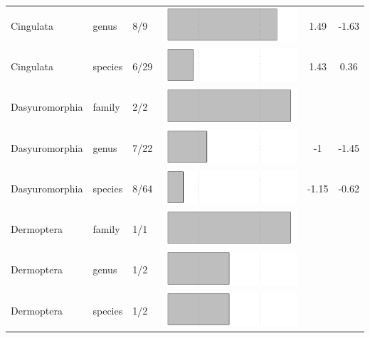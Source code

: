 \begin{longtable}{lL{1.8cm}C{2cm}ccc}
  Cingulata & genus & 8/9 & \includegraphics[width=0.20\linewidth, height=0.05\linewidth]{Missing_mammals/Table_figures/bar14.pdf} & 1.49 & -1.63 \\ 
  Cingulata & species & 6/29 & \includegraphics[width=0.20\linewidth, height=0.05\linewidth]{Missing_mammals/Table_figures/bar15.pdf} & 1.43 & 0.36 \\ 
  Dasyuromorphia & family & 2/2 & \includegraphics[width=0.20\linewidth, height=0.05\linewidth]{Missing_mammals/Table_figures/bar16.pdf} &   &   \\ 
  Dasyuromorphia & genus & 7/22 & \includegraphics[width=0.20\linewidth, height=0.05\linewidth]{Missing_mammals/Table_figures/bar17.pdf} & -1 & -1.45 \\ 
  Dasyuromorphia & species & 8/64 & \includegraphics[width=0.20\linewidth, height=0.05\linewidth]{Missing_mammals/Table_figures/bar18.pdf} & -1.15 & -0.62 \\ 
  Dermoptera & family & 1/1 & \includegraphics[width=0.20\linewidth, height=0.05\linewidth]{Missing_mammals/Table_figures/bar19.pdf} &   &   \\ 
  Dermoptera & genus & 1/2 & \includegraphics[width=0.20\linewidth, height=0.05\linewidth]{Missing_mammals/Table_figures/bar20.pdf} &   &   \\ 
  Dermoptera & species & 1/2 & \includegraphics[width=0.20\linewidth, height=0.05\linewidth]{Missing_mammals/Table_figures/bar21.pdf} &   &   \\ 

\end{longtable}
